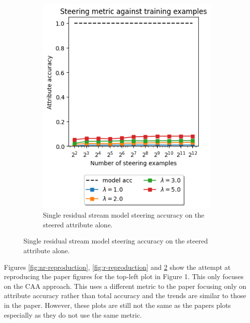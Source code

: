 \begin{figure}
\begin{subfigure}{0.45\textwidth}
        \includegraphics[width=\textwidth]{figures/single-residual-reproduction.png}
        \caption{Single residual stream model steering accuracy on the steered attribute alone.}
        \label{fig:sr-reproduction}
    \end{subfigure}
\end{figure}

Figures \ref{fig:nr-reproduction}, \ref{fig:r-reproduction} and \ref{fig:sr-reproduction} show the attempt at reproducing the paper figures for the top-left plot in Figure 1.
This only focuses on the CAA approach.
This uses a different metric to the paper focusing only on attribute accuracy rather than total accuracy and the trends are similar to those in the paper.
However, these plots are still not the same as the papers plots especially as they do not use the same metric.

